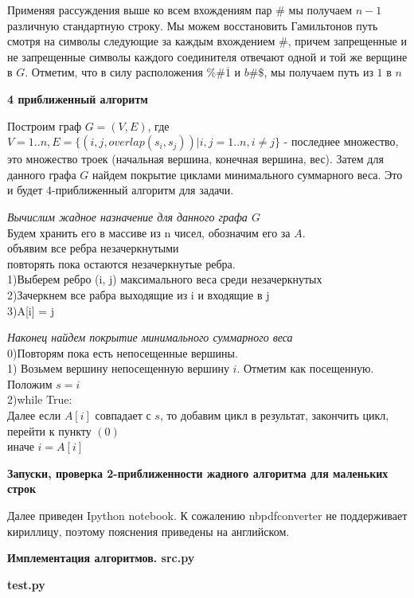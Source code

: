 \documentclass[11pt,a4paper]{article}
\begin{document}
Применяя рассуждения выше ко всем вхождениям пар $\#$ мы получаем $n - 1$ различную стандартную строку. Мы можем восстановить Гамильтонов путь смотря на символы следующие за каждым вхождением $\#$,
причем запрещенные и не запрещенные символы каждого соединителя отвечают одной и той же верщине в $G$. Отметим, что в силу расположения $\%\#\overline{1}$ и $b\#\$$, мы получаем путь из $1$ в $n$
\\
\begin{center}
\Large
\textbf{4 приближенный алгоритм}
\normalsize
\end{center}
\par
Построим граф $G = (V, E)$, где $V = 1..n, E = \{(i, j, overlap(s_i, s_j))| i, j = 1..n, i \ne j\}$ - последнее множество,
это множество троек (начальная вершина, конечная вершина, вес). Затем для данного графа $G$ найдем покрытие циклами минимального суммарного веса.
Это и будет 4-приближенный алгоритм для задачи.
\par
\textit{Вычислим жадное назначение для данного графа $G$}
\\
Будем хранить его в массиве из n чисел, обозначим его за $A$.
\\
объявим все ребра незачеркнутыми\\
повторять пока остаются незачеркнутые ребра.\\
1)Выберем ребро (i, j) максимального веса среди незачеркнутых\\
2)Зачеркнем все рабра выходящие из i и входящие в j\\
3)A[i] = j
\par
\textit{Наконец найдем покрытие минимального суммарного веса}\\
0)Повторям пока есть непосещенные вершины.
\\
1) Возьмем вершину непосещенную вершину $i$. Отметим как посещенную. Положим $s = i$\\
2)while True:\\
Далее если $A[i]$ совпадает с $s$, то добавим цикл в результат, закончить цикл, перейти к пункту $(0)$\\
иначе $i = A[i]$
\begin{center}
\Large
\textbf{Запуски, проверка 2-приближенности жадного алгоритма для маленьких строк}
\normalsize
\end{center}
Далее приведен Ipython notebook. К сожалению nbpdfconverter не поддерживает кириллицу, поэтому пояснения приведены на английском.


\begin{center}
\Large
\textbf{Имплементация алгоритмов. src.py}
\normalsize
\end{center}
\par
\lstset{
  caption=Descriptive Caption Text,
  basicstyle=\footnotesize, frame=tb,
  xleftmargin=-.0\textwidth, xrightmargin=.2\textwidth
}

\begin{center}
\Large
\textbf{test.py}
\normalsize
\end{center}

\end{document}
